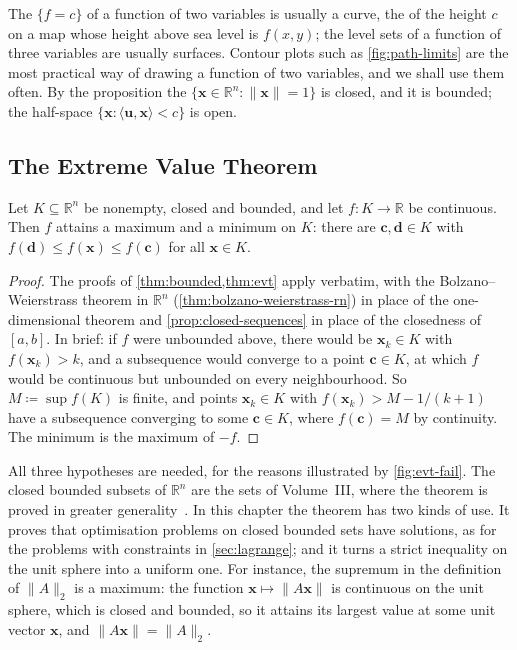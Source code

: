 The  $\{f=c\}$ of a function of two variables is usually a curve, the  of the height $c$ on a map whose height above sea level is $f(x,y)$; the level sets of a function of three variables are usually surfaces. Contour plots such as \cref{fig:path-limits} are the most practical way of drawing a function of two variables, and we shall use them often. By the proposition the  $\{\mathbf x\in\mathbb R^n: \|\mathbf x\|=1\}$ is closed, and it is bounded; the half-space $\{\mathbf x: \langle\mathbf u,\mathbf x\rangle<c\}$ is open.

\subsection{The Extreme Value Theorem}

\begin{theorem}
\label{thm:evt-rn}
Let $K\subseteq\mathbb R^n$ be nonempty, closed and bounded, and let $f\colon K\to\mathbb R$ be continuous. Then $f$ attains a maximum and a minimum on $K$: there are $\mathbf c,\mathbf d\in K$ with $f(\mathbf d)\le f(\mathbf x)\le f(\mathbf c)$ for all $\mathbf x\in K$.
\end{theorem}

\begin{proof}
The proofs of \cref{thm:bounded,thm:evt} apply verbatim, with the Bolzano--Weierstrass theorem in $\mathbb R^n$ (\cref{thm:bolzano-weierstrass-rn}) in place of the one-dimensional theorem and \cref{prop:closed-sequences} in place of the closedness of $[a,b]$. In brief: if $f$ were unbounded above, there would be $\mathbf x_k\in K$ with $f(\mathbf x_k)>k$, and a subsequence would converge to a point $\mathbf c\in K$, at which $f$ would be continuous but unbounded on every neighbourhood. So $M\coloneqq\sup f(K)$ is finite, and points $\mathbf x_k\in K$ with $f(\mathbf x_k)>M-1/(k+1)$ have a subsequence converging to some $\mathbf c\in K$, where $f(\mathbf c)=M$ by continuity. The minimum is the maximum of $-f$.
\end{proof}

All three hypotheses are needed, for the reasons illustrated by \cref{fig:evt-fail}. The closed bounded subsets of $\mathbb R^n$ are the  sets of Volume~III, where the theorem is proved in greater generality~\cite[Thm.~4.16]{rudin1976}. In this chapter the theorem has two kinds of use. It proves that optimisation problems on closed bounded sets have solutions, as for the problems with constraints in \cref{sec:lagrange}; and it turns a strict inequality on the unit sphere into a uniform one. For instance, the supremum in the definition of $\|A\|_2$ is a maximum: the function $\mathbf x\mapsto\|A\mathbf x\|$ is continuous on the unit sphere, which is closed and bounded, so it attains its largest value at some unit vector $\mathbf x$, and $\|A\mathbf x\|=\|A\|_2$.

